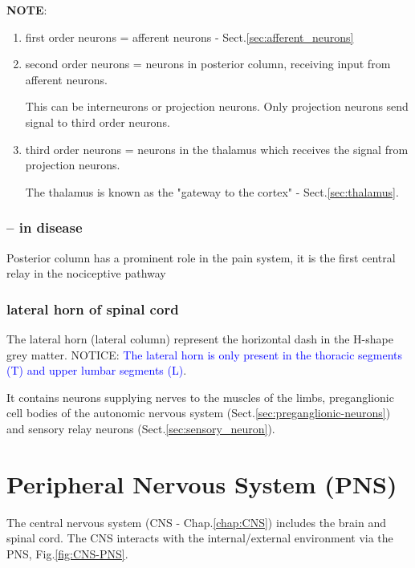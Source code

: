 {\bf NOTE}: 
\begin{enumerate}
  \item first order neurons = afferent neurons - Sect.\ref{sec:afferent_neurons}
  
  
  \item second order neurons = neurons in posterior column, receiving input from
  afferent neurons.
  
  This can be interneurons or projection neurons. Only projection neurons send
  signal to third order neurons.
  
  \item third order neurons = neurons in the thalamus which receives the signal
  from projection neurons.
  
   The thalamus is known as the "gateway to the cortex" -
   Sect.\ref{sec:thalamus}.
   
\end{enumerate}

\subsection{-- in disease}

Posterior column has a prominent role in the pain system, it is the first
central relay in the nociceptive pathway




\subsection{lateral horn of spinal cord}
\label{sec:lateral-grey-column}

The lateral horn (lateral column) represent the horizontal dash in the H-shape
grey matter. NOTICE: \textcolor{blue}{The lateral horn is only present in the
thoracic segments (T) and upper lumbar segments (L)}.

It contains neurons supplying nerves to the muscles of the limbs, preganglionic
cell bodies of the autonomic nervous system
(Sect.\ref{sec:preganglionic-neurons}) and sensory relay neurons
(Sect.\ref{sec:sensory_neuron}).

\chapter{Peripheral Nervous System (PNS)}
\label{chap:periph-nerv-syst}

The central nervous system (CNS - Chap.\ref{chap:CNS}) includes the brain and
spinal cord. The CNS interacts with the internal/external environment via the
PNS, Fig.\ref{fig:CNS-PNS}. 

